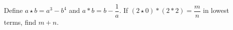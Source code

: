 Define $ a\star b=a^3-b^4 $ and $ a*b=b-\dfrac{1}{a}$. If $(2\star0)*(2*2)=\dfrac{m}{n}$ in lowest terms, find $ m+n $.
